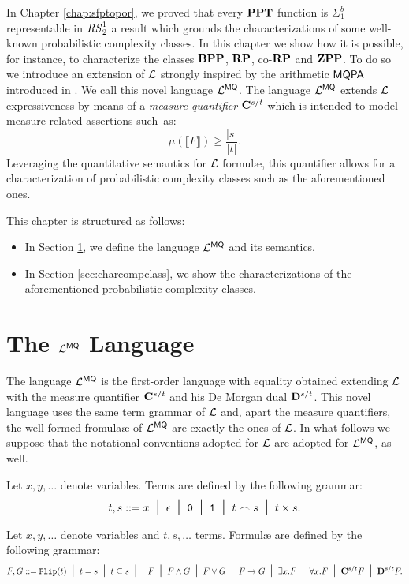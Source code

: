 In Chapter \ref{chap:sfptopor}, we proved that every $\mathbf{PPT}$ function is $\Sigma^b_1$
representable in ${\mathit{RS}^1_2}$ a result which grounds the characterizations of some well-known probabilistic complexity classes.
%
In this chapter we show how it is possible, for instance, to characterize
the classes $\mathbf{BPP}$, $\mathbf{RP}$, co-$\mathbf{RP}$ and $\mathbf{ZPP}$.
%
To do so we introduce an extension of $\mathcal{L}$ strongly
inspired by the arithmetic $\mathsf{MQPA}$ introduced in \cite{ADLP21}. We call this novel language $\mathcal{L}^{\mathsf{MQ}}$.
%
The language $\mathcal{L}^{\mathsf{MQ}}$ extends $\mathcal{L}$ expressiveness by means of a \emph{measure quantifier}
$\mathbf{C}^{s/t}$ which is intended to model measure-related assertions such~as:
%
$$
\mu \left(\llbracket F\rrbracket\right) \ge \frac {|s|}{|t|}.
$$
%
Leveraging the quantitative semantics for $\mathcal{L}$ formul\ae{},
this quantifier allows for a characterization of probabilistic complexity classes such as the
aforementioned ones.

This chapter is structured as follows:

\begin{itemize}
  \item In Section \ref{sec:lmq}, we define the language $\mathcal{L}^{\mathsf{MQ}}$ and its semantics.
  \item In Section \ref{sec:charcompclass}, we show the characterizations of the aforementioned
  probabilistic complexity classes.
\end{itemize}

\section{The $\mathcal{L}^{\mathsf{MQ}}$ Language}
\label{sec:lmq}

The language $\mathcal{L}^{\mathsf{MQ}}$ is the
first-order language
with equality obtained extending $\mathcal{L}$ with the measure quantifier $\mathbf{C}^{s/t}$
and his De Morgan dual $\mathbf{D}^{s/t}$.
%
This novel language uses the same term grammar of $\mathcal{L}$ and, apart the measure quantifiers,
the well-formed fromula\ae{} of $\mathcal{L}^{\mathsf{MQ}}$ are exactly the ones of $\mathcal{L}$.
%
In what follows we suppose that the notational conventions adopted for $\mathcal{L}$
are adopted for $\mathcal{L}^{\mathsf{MQ}}$, as well.

\begin{defn}
Let $x,y,\dots$ denote variables.
Terms are defined by the following grammar:
$$
t,s ::= x \; \; \mbox{\Large{$\mid$}}\;\; \epsilon \; \; \mbox{\Large{$\mid$}}\;\; \mathtt{0} \; \; \mbox{\Large{$\mid$}}\;\; \mathtt{1}
\; \; \mbox{\Large{$\mid$}}\;\; t \frown s \; \; \mbox{\Large{$\mid$}}\;\; t\times s.
$$
\end{defn}


\begin{defn}[Formul\ae{}]
Let $x,y,\dots$ denote variables and
$t,s,\dots$ terms.
Formul\ae{} are defined by the following
grammar:
\small
$$
F, G ::= \mathtt{Flip}(t) \; \; \mbox{\Large{$\mid$}}\;\; t=s \; \; \mbox{\Large{$\mid$}}\;\; t\subseteq s
\; \; \mbox{\Large{$\mid$}}\;\; \neg F \; \; \mbox{\Large{$\mid$}}\;\; F\wedge G \; \; \mbox{\Large{$\mid$}}\;\; F\vee G
\; \; \mbox{\Large{$\mid$}}\;\; F\rightarrow G \; \; \mbox{\Large{$\mid$}}\;\; \exists x.F \; \; \mbox{\Large{$\mid$}}\;\;
\forall x.F \; \; \mbox{\Large{$\mid$}}\;\; \mathbf{C}^{s/t}F \; \; \mbox{\Large{$\mid$}}\;\; \mathbf{D}^{s/t}F.
$$
\normalsize
\end{defn}

